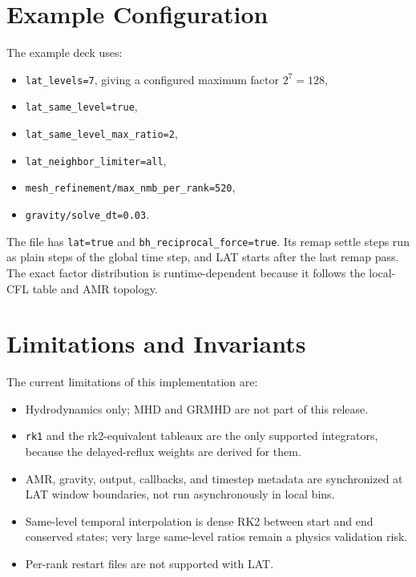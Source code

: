 \documentclass[11pt]{article}
\begin{document}
\section{Example Configuration}

The example deck  uses:
\begin{itemize}
  \item \texttt{lat\_levels=7}, giving a configured maximum factor
        \(2^7=128\),
  \item \texttt{lat\_same\_level=true},
  \item \texttt{lat\_same\_level\_max\_ratio=2},
  \item \texttt{lat\_neighbor\_limiter=all},
  \item \texttt{mesh\_refinement/max\_nmb\_per\_rank=520},
  \item \texttt{gravity/solve\_dt=0.03}.
\end{itemize}
The file has \texttt{lat=true} and \texttt{bh\_reciprocal\_force=true}.  Its remap
settle steps run as plain steps of the global time step, and LAT starts after the last
remap pass.  The exact factor distribution is runtime-dependent because it follows
the local-CFL table and AMR topology.

\section{Limitations and Invariants}

The current limitations of this implementation are:
\begin{itemize}
  \item Hydrodynamics only; MHD and GRMHD are not part of this release.
  \item \texttt{rk1} and the rk2-equivalent tableaux are the only supported
        integrators, because the delayed-reflux weights are derived for them.
  \item AMR, gravity, output, callbacks, and timestep metadata are synchronized
        at LAT window boundaries, not run asynchronously in local bins.
  \item Same-level temporal interpolation is dense RK2 between start and end
        conserved states; very large same-level ratios remain a physics
        validation risk.
  \item Per-rank restart files are not supported with LAT.
\end{itemize}
\end{document}
